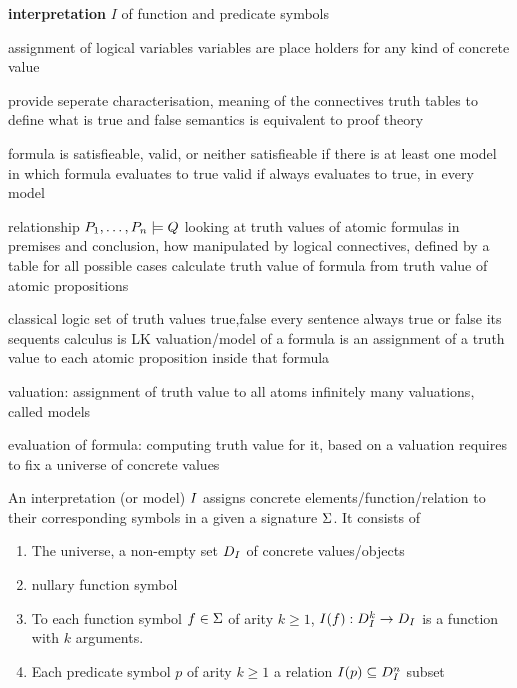             \textbf{interpretation} $I$ of function and predicate symbols

            assignment of logical variables
            variables are place holders for any kind of concrete value

            provide seperate characterisation, meaning of the connectives
            truth tables
            to define what is true and false
            semantics is equivalent to proof theory

            formula is satisfieable, valid, or neither
            satisfieable if there is at least one model in which formula evaluates to true
            valid if always evaluates to true, in every model

            relationship
            $P_1,\ldots,P_n\models Q$
            looking at truth values of atomic formulas in premises and conclusion, how manipulated by logical connectives, defined by a table for all possible cases
            calculate truth value of formula from truth value of atomic propositions

            classical logic \cite{reis2014cutelimination}
            set of truth values true,false
            every sentence always true or false
            its sequents calculus is LK
            valuation/model of a formula is an assignment of a truth value to each atomic proposition inside that formula

            valuation: assignment of truth value to all atoms
            infinitely many valuations, called models

            evaluation of formula: computing truth value for it, based on a valuation
            requires to fix a universe of concrete values

            \begin{definition}[Interpretation]
                An interpretation (or model) $I$ assigns concrete elements/function/relation to their corresponding symbols in a given a signature $\Sigma$. It consists of
                \begin{enumerate}
                    \item The universe, a non-empty set $D_{I}$ of concrete values/objects
                    \item nullary function symbol
                    \item To each function symbol $f\in\Sigma$ of arity $k\geq 1$, $I(f):D_{I}^k\rightarrow D_{I}$ is a function with $k$ arguments.
                    \item Each predicate symbol $p$ of arity $k\geq 1$ a relation $I(p)\subseteq D_{I}^n$ subset
                \end{enumerate}

            \end{definition}

